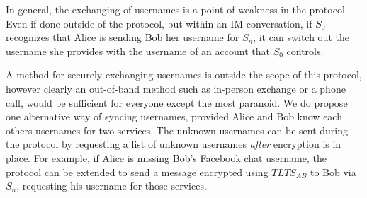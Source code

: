 \documentclass[twoside,10pt]{article}
\begin{document}
\begin{multicols}{2}
In general, the exchanging of usernames is a point of weakness in the protocol.  Even if done outside of the protocol, but within an IM conversation, if $S_0$ recognizes that Alice is sending Bob her username for $S_n$, it can switch out the username she provides with the username of an account that $S_0$ controls.

A method for securely exchanging usernames is outside the scope of this protocol, however clearly an out-of-band method such as in-person exchange or a phone call, would be sufficient for everyone except the most paranoid.  We do propose one alternative way of syncing usernames, provided Alice and Bob know each others usernames for two services.  The unknown usernames can be sent during the protocol by requesting a list of unknown usernames \emph{after} encryption is in place.  For example, if Alice is missing Bob's Facebook chat username, the protocol can be extended to send a message encrypted using $TLTS_{AB}$ to Bob via $S_n$, requesting his username for those services.




\end{multicols}
\end{document}
